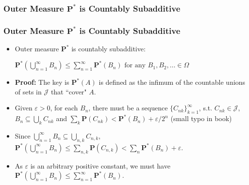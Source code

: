 \documentclass[%
]{beamer}
\newcommand{\BP}{\mathbf{P}}
\begin{document}
\subsubsection{Outer Measure $\BP^*$ is Countably Subadditive}
\frame
{
  \frametitle{Outer Measure $\BP^*$ is Countably Subadditive}

   \begin{itemize}

            \item<1->   [] \begin{Lemma}[2.3.6.] Outer measure $\BP^*$ is countably subadditive:  
            
            $\BP^*(\bigcup_{n=1}^{\infty} B_n)\leq \sum_{n=1}^{\infty} \BP^* (B_n) \text{ for any }B_1, B_2,\ldots \in \Omega$
               \end{Lemma}    
       
              \item<2-> []\textbf{Proof:} The key is $\BP^* (A)$ is defined as the infimum of the countable unions of sets in $\mathcal{J}$ that ``cover" $A$.
             \item<3-> [1)] Given $\varepsilon>0$, for each $B_n$, there must be a sequence $\{C_{nk}\}_{k=1}^{\infty}$, s.t. $C_{nk}\in \mathcal{J}$, $B_n \subseteq \bigcup_k  C_{nk}$ and $\sum_k \BP(C_{nk}) < \BP^* (B_n)+\varepsilon/2^n$ (small typo in book)
               \item<4-> [2)] Since $\bigcup_{n=1}^{\infty} B_n \subseteq \bigcup_{n, k} C_{n,k}$, $\BP^*(\bigcup_{n=1}^{\infty} B_n) \leq \sum_{n, k} \BP(C_{n,k}) <  \sum_n \BP^* (B_n)+\varepsilon$. 
                \item<4-> [3)] As $\varepsilon$ is an arbitrary positive constant, we must have $\BP^*(\bigcup_{n=1}^{\infty} B_n)\leq \sum_{n=1}^{\infty} \BP^* (B_n) $.
    
                 \end{itemize}
}
\end{document}
